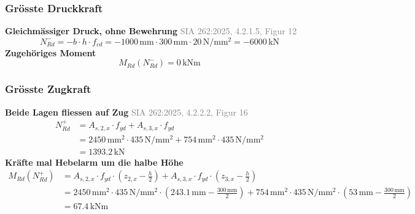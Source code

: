 \documentclass[11pt,a4paper]{article}
\newcommand{\normref}[1]{{\small\textcolor{gray}{#1}}}
\begin{document}
\subsubsection{Grösste Druckkraft}
\noindent\textbf{Gleichmässiger Druck, ohne Bewehrung} \hfill \normref{SIA 262:2025, 4.2.1.5, Figur 12}
\begin{equation*}
N_{Rd}^{-} = -b \cdot h \cdot f_{cd} = -1000\,\mathrm{mm} \cdot 300\,\mathrm{mm} \cdot 20\,\mathrm{N}/\mathrm{mm}^{2} = -6000\,\mathrm{kN}
\end{equation*}
\noindent\textbf{Zugehöriges Moment}
\begin{equation*}
M_{Rd}(N_{Rd}^{-}) = 0\,\mathrm{kNm}
\end{equation*}
\subsubsection{Grösste Zugkraft}
\noindent\textbf{Beide Lagen fliessen auf Zug} \hfill \normref{SIA 262:2025, 4.2.2.2, Figur 16}
\begin{equation*}
\begin{aligned}
  N_{Rd}^{+} &= A_{s,2,x} \cdot f_{yd} + A_{s,3,x} \cdot f_{yd} \\
  &= 2450\,\mathrm{mm}^{2} \cdot 435\,\mathrm{N}/\mathrm{mm}^{2} + 754\,\mathrm{mm}^{2} \cdot 435\,\mathrm{N}/\mathrm{mm}^{2} \\
  &= 1393.2\,\mathrm{kN}
\end{aligned}
\end{equation*}
\noindent\textbf{Kräfte mal Hebelarm um die halbe Höhe}
\begin{equation*}
\begin{aligned}
  M_{Rd}(N_{Rd}^{+}) &= A_{s,2,x} \cdot f_{yd} \cdot \left(z_{2,x} - \tfrac{h}{2}\right) + A_{s,3,x} \cdot f_{yd} \cdot \left(z_{3,x} - \tfrac{h}{2}\right) \\
  &= 2450\,\mathrm{mm}^{2} \cdot 435\,\mathrm{N}/\mathrm{mm}^{2} \cdot \left(243.1\,\mathrm{mm} - \tfrac{300\,\mathrm{mm}}{2}\right) + 754\,\mathrm{mm}^{2} \cdot 435\,\mathrm{N}/\mathrm{mm}^{2} \cdot \left(53\,\mathrm{mm} - \tfrac{300\,\mathrm{mm}}{2}\right) \\
  &= 67.4\,\mathrm{kNm}
\end{aligned}
\end{equation*}
\end{document}
